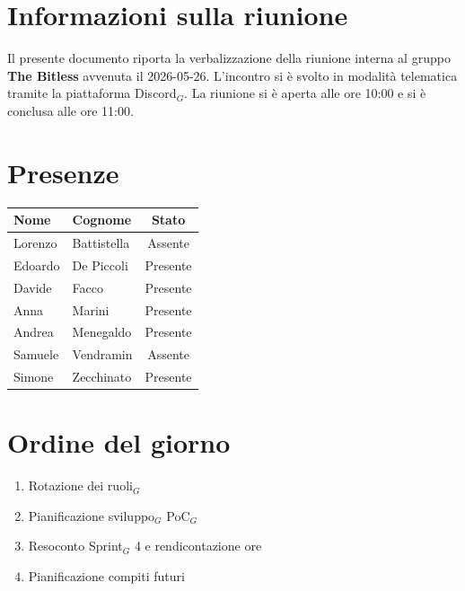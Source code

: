 \documentclass[a4paper, 10pt, colorlinks=true, linkcolor=black, urlcolor=blue, citecolor=blue, hidelinks]{article}
\begin{document}
\newcommand{\titolo}{Verbale interno}
\newcommand{\dataverbale}{2026-05-26}
\newcommand{\dataversione}{2026-05-28}
\newcommand{\versione}{1.0.0}
\newcommand{\stato}{Approvato}
\newcommand{\destinatari}{The Bitless, prof. Tullio Vardanega, prof. Riccardo Cardin}
\def\templatedir{../../../../templates}

\begin{titlepage}

\end{titlepage}

\newpage
\tableofcontents 

\newpage
{}
\section{Informazioni sulla riunione}
Il presente documento riporta la verbalizzazione della riunione interna al gruppo \textbf{The Bitless} avvenuta il \dataverbale{}. L'incontro si è svolto in modalità telematica tramite la piattaforma Discord$_G$. La riunione si è aperta alle ore 10:00 e si è conclusa alle ore 11:00.

\section{Presenze}
\begin{center}
\begin{tabular}{|l|l|c|}
\hline
\textbf{Nome} & \textbf{Cognome} & \textbf{Stato} \\
\hline
Lorenzo & Battistella & Assente \\
Edoardo & De Piccoli & Presente \\
Davide & Facco & Presente \\
Anna & Marini & Presente \\
Andrea & Menegaldo & Presente \\
Samuele & Vendramin & Assente \\
Simone & Zecchinato & Presente \\
\hline
\end{tabular}
\end{center}

\section{Ordine del giorno}
\begin{enumerate}
    \item Rotazione dei ruoli$_G$ 
    \item Pianificazione sviluppo$_G$ PoC$_G$
    \item Resoconto Sprint$_G$ 4 e rendicontazione ore
    \item Pianificazione compiti futuri
\end{enumerate}
\end{document}
